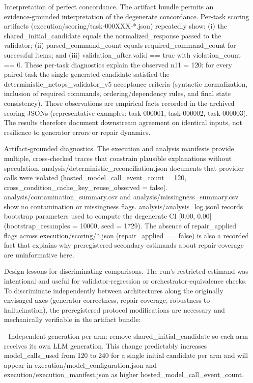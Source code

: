 \documentclass[conference]{IEEEtran}
\begin{document}
Interpretation of perfect concordance. The artifact bundle permits an evidence‑grounded interpretation of the degenerate concordance. Per‑task scoring artifacts (execution/scoring/task‑000XXX‑*.json) repeatedly show: (i) the shared\_initial\_candidate equals the normalized\_response passed to the validator; (ii) parsed\_command\_count equals required\_command\_count for successful items; and (iii) validation\_after.valid == true with violation\_count == 0. These per‑task diagnostics explain the observed n11 = 120: for every paired task the single generated candidate satisfied the deterministic\_netops\_validator\_v5 acceptance criteria (syntactic normalization, inclusion of required commands, ordering/dependency rules, and final state consistency). Those observations are empirical facts recorded in the archived scoring JSONs (representative examples: task‑000001, task‑000002, task‑000003). The results therefore document downstream agreement on identical inputs, not resilience to generator errors or repair dynamics.

Artifact‑grounded diagnostics. The execution and analysis manifests provide multiple, cross‑checked traces that constrain plausible explanations without speculation. analysis/deterministic\_reconciliation.json documents that provider calls were isolated (hosted\_model\_call\_event\_count = 120, cross\_condition\_cache\_key\_reuse\_observed = false). analysis/contamination\_summary.csv and analysis/missingness\_summary.csv show no contamination or missingness flags. analysis/analysis\_log.jsonl records bootstrap parameters used to compute the degenerate CI [0.00, 0.00] (bootstrap\_resamples = 10000, seed = 1729). The absence of repair\_applied flags across execution/scoring/*.json (repair\_applied == false) is also a recorded fact that explains why preregistered secondary estimands about repair coverage are uninformative here.

Design lessons for discriminating comparisons. The run's restricted estimand was intentional and useful for validator‑regression or orchestrator‑equivalence checks. To discriminate independently between architectures along the originally envisaged axes (generator correctness, repair coverage, robustness to hallucination), the preregistered protocol modifications are necessary and mechanically verifiable in the artifact bundle:

- Independent generation per arm: remove shared\_initial\_candidate so each arm receives its own LLM generation. This change predictably increases model\_calls\_used from 120 to 240 for a single initial candidate per arm and will appear in execution/model\_configuration.json and execution/execution\_manifest.json as higher hosted\_model\_call\_event\_count.
\end{document}
